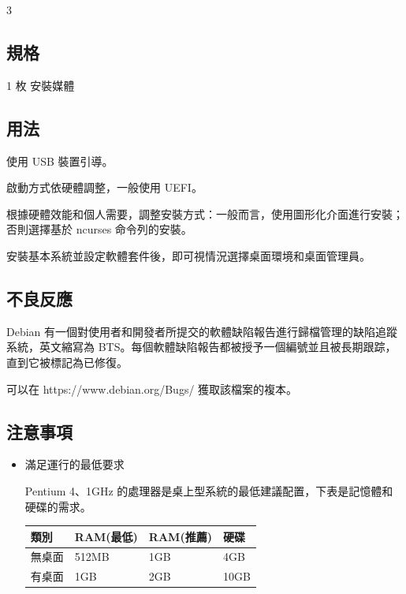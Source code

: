 \documentclass{article}
\begin{document}
\begin{multicols*}{3}
	\begin{tcolorbox}
	\section*{規格}
	\end{tcolorbox}

	1 枚 安裝媒體

	\medskip

	\begin{tcolorbox}
	\section*{用法}
	\end{tcolorbox}

	使用 USB 裝置引導。

	啟動方式依硬體調整，一般使用 UEFI。

	根據硬體效能和個人需要，調整安裝方式：一般而言，使用圖形化介面進行安裝；否則選擇基於 ncurses 命令列的安裝。

	安裝基本系統並設定軟體套件後，即可視情況選擇桌面環境和桌面管理員。

	\medskip

	\begin{tcolorbox}
	\section*{不良反應}
	\end{tcolorbox}

	Debian 有一個對使用者和開發者所提交的軟體缺陷報告進行歸檔管理的缺陷追蹤系統，英文縮寫為 BTS。每個軟體缺陷報告都被授予一個編號並且被長期跟踪，直到它被標記為已修復。

	可以在 https://www.debian.org/Bugs/ 獲取該檔案的複本。

	\medskip


	\begin{tcolorbox}
	\section*{注意事項}
	\end{tcolorbox}
	\begin{itemize}[leftmargin=*]

		\item 滿足運行的最低要求

		Pentium 4、1GHz 的處理器是桌上型系統的最低建議配置，下表是記憶體和硬碟的需求。

		{\small\begin{tabularx}{\linewidth}{|X|X|X|X|}
			\hline
			類別 & RAM\newline (最低) & RAM\newline (推薦) & 硬碟 \\
			\hline
			無桌面 & 512MB & 1GB & 4GB \\
			\hline
			有桌面 & 1GB & 2GB & 10GB \\
			\hline
		\end{tabularx}}


\end{itemize}
\end{multicols*}
\end{document}

